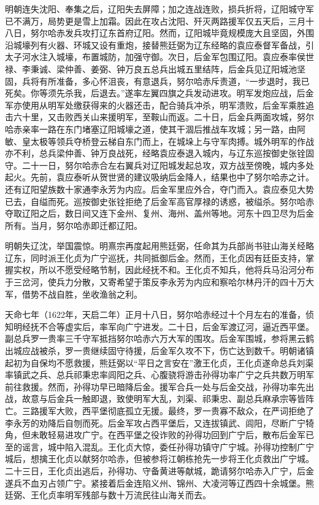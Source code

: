 明朝连失沈阳、奉集之后，辽阳失去屏障；加之连战连败，损兵折将，辽阳城守军已不满万，局势更是雪上加霜。因此在攻占沈阳、歼灭两路援军仅五天后，三月十八日，努尔哈赤发兵攻打辽东首府辽阳。然而，辽阳城毕竟规模庞大且坚固，外围沿城壕列有火器、环城又设有重炮，接替熊廷弼为辽东经略的袁应泰督军备战，引太子河水注入城壕，布置城防，加强守御。次日，后金军包围辽阳。袁应泰率侯世禄、李秉诚、梁仲善、姜弼、钟万良五总兵出城五里结阵，后金兵见辽阳城池坚固，兵将有所准备，多心怀沮丧，有意退兵，努尔哈赤斥责道，“一步退时，我已死矣。你等须先杀我，后退去。”遂率左翼四旗之兵发动进攻。明军发炮应战，后金军亦使用从明军处缴获得来的火器还击，配合骑兵冲杀，明军溃败，后金军乘胜追击六十里，又击败西关山来援明军，至鞍山而返。二十日，后金兵两面攻城，努尔哈赤亲率一路在东门堵塞辽阳城壕之道，使其干涸后推战车攻城；另一路，由阿敏、皇太极等领兵夺桥登云梯自东门而上，在城垛上与守军肉搏。城外明军的作战亦不利，总兵梁仲善、钟万良战死，经略袁应泰退入城内，与辽东巡按御史张铨固守。二十一日，努尔哈赤合左右翼兵对辽阳城发起总攻，双方战至傍晚，城内多处起火。先前，袁应泰听从贺世贤的建议吸纳后金降人，结果也中了努尔哈赤之计。还有辽阳望族数十家通李永芳为内应。后金军里应外合，夺门而入。袁应泰见大势已去，自缢而死。巡按御史张铨拒绝了后金军高官厚禄的诱惑，被缢杀。努尔哈赤夺取辽阳之后，数日间又连下金州、复州、海州、盖州等地。河东十四卫尽为后金所有。当月，努尔哈赤即迁都辽阳。

明朝失辽沈，举国震惊。明熹宗再度起用熊廷弼，任命其为兵部尚书驻山海关经略辽东，同时派王化贞为广宁巡抚，共同抵御后金。然而，王化贞因有廷臣支持，掌握实权，所以不愿受经略节制，因此经抚不和。王化贞不知兵，他将兵马沿河分布于三岔河，使兵力分散，又寄希望于策反李永芳为内应和察哈尔林丹汗的四十万大军，借势不战自胜，坐收渔翁之利。

天命七年（1622年，天启二年）正月十八日，努尔哈赤经过十个月左右的准备，侦知明经抚不合等虚实后，率军向广宁进发。二十日，后金军渡辽河，逼近西平堡。副总兵罗一贵率三千守军抵挡努尔哈赤六万大军的围攻。后金军围城，参将黑云鹤出城应战被杀，罗一贵继续固守待援，后金军久攻不下，伤亡达到数千。明朝诸镇起初为自保均不愿救援，熊廷弼以“平日之言安在”激王化贞，王化贞遂命总兵刘渠率镇武之兵、总兵祁秉忠率闾阳之兵、心腹骁将游击孙得功率广宁之兵共数万明军前往救援。然而，孙得功早已暗降后金。援军合兵一处与后金交战，孙得功率先出战，故意与后金兵一触即退，致使明军大乱，刘渠、祁秉忠、副总兵麻承宗等皆阵亡。三路援军大败，西平堡彻底孤立无援。最终，罗一贵寡不敌众，在严词拒绝了李永芳的劝降后自刎而死。后金军攻占西平堡后，又连拔镇武、闾阳，尽断广宁犄角，但未敢轻易进攻广宁。在西平堡之役诈败的孙得功回到广宁后，散布后金军已至的谣言，城中陷入混乱。王化贞大惊，委任孙得功镇守广宁城。孙得功控制广宁城后，想擒王化贞以献努尔哈赤，但被参将江朝栋抢先一步将王化贞救出广宁城。二十三日，王化贞出逃后，孙得功、守备黄进等献城，跪请努尔哈赤入广宁，后金遂兵不血刃占领广宁。紧接着后金连陷义州、锦州、大凌河等辽西四十余城堡。熊廷弼、王化贞率明军残部与数十万流民往山海关而去。

